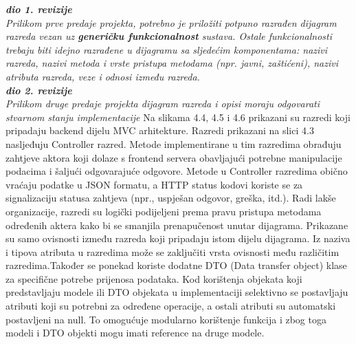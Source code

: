 			\textbf{\textit{dio 1. revizije}}\\
			
			\textit{Prilikom prve predaje projekta, potrebno je priložiti potpuno razrađen dijagram razreda vezan uz \textbf{generičku funkcionalnost} sustava. Ostale funkcionalnosti trebaju biti idejno razrađene u dijagramu sa sljedećim komponentama: nazivi razreda, nazivi metoda i vrste pristupa metodama (npr. javni, zaštićeni), nazivi atributa razreda, veze i odnosi između razreda.}\\
			
			\textbf{\textit{dio 2. revizije}}\\			
			
			\textit{Prilikom druge predaje projekta dijagram razreda i opisi moraju odgovarati stvarnom stanju implementacije}
		\fi
			Na slikama 4.4, 4.5 i 4.6 prikazani su razredi koji pripadaju backend dijelu MVC arhitekture. Razredi prikazani na slici 4.3 nasljeđuju Controller razred. Metode implementirane u tim razredima obrađuju zahtjeve aktora koji dolaze s frontend servera obavljajući potrebne manipulacije podacima i šaljući odgovarajuće odgovore. Metode u Controller razredima obično vraćaju podatke u JSON formatu, a HTTP status kodovi koriste se za signalizaciju statusa zahtjeva (npr., uspješan odgovor, greška, itd.). Radi lakše organizacije, razredi su logički podijeljeni prema pravu pristupa metodama određenih aktera kako bi se smanjila prenapučenost unutar dijagrama. Prikazane su samo ovisnosti između razreda koji pripadaju istom dijelu dijagrama. Iz naziva i tipova atributa u razredima može se zaključiti vrsta ovisnosti među različitim razredima.Također se ponekad koriste dodatne DTO (Data transfer object) klase za specifične potrebe prijenosa podataka. Kod korištenja objekata koji predstavljaju modele ili DTO objekata u implementaciji selektivno se postavljaju atributi koji su potrebni za određene operacije, a ostali atributi su automatski postavljeni na null. To omogućuje modularno korištenje funkcija i zbog toga modeli i DTO objekti mogu imati reference na druge modele.
			
			\eject
		
			\vspace{12pt}						
			
